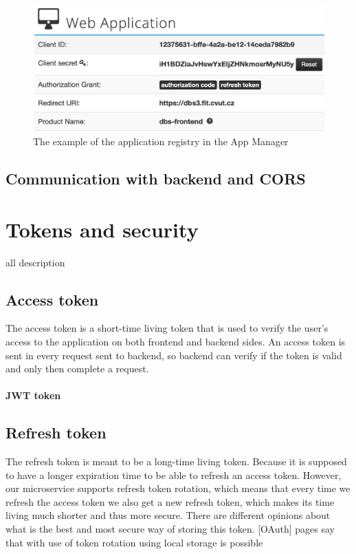 \begin{figure}[hp]
\centering
\includegraphics[scale=0.52]{../png/app_manager.png}
\caption{The example of the application registry in the App Manager}
\end{figure}




\subsection{Communication with backend and CORS}


\section{Tokens and security}


all description

\subsection{Access token}
The access token is a short-time living token that is used to verify the user's access to the application on both frontend and backend sides. An access token is sent in every request sent to backend, so backend can verify if the token is valid and only then complete a request.

\paragraph*{JWT token}

\subsection{Refresh token}
The refresh token is meant to be a long-time living token. Because it is supposed to have a longer expiration time to be able to refresh an access token.
However, our microservice supports refresh token rotation, which means that every time we refresh the access token we also get a new refresh token, which makes its time living much shorter and thus more secure. There are different opinions about what is the best and most secure way of storing this token. [OAuth] pages say that with use of token rotation using local storage is possible


